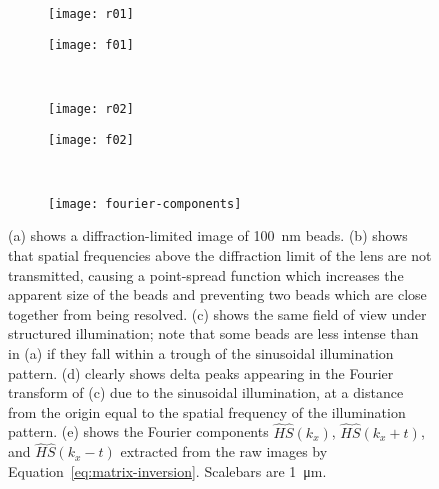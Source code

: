 \begin{figure}[p]
\centering
\begin{subfigure}[b]{0.45\textwidth}
	\texttt{[image: r01]}
	\caption{}\label{fig:beads-widefield}
\end{subfigure}
\raisebox{9.3em}{\noindent\Huge$\Leftrightarrow$}
\begin{subfigure}[b]{0.45\textwidth}
	\texttt{[image: f01]}
	\caption{}\label{fig:fourier-widefield}
\end{subfigure}
~\newline
\begin{subfigure}[b]{0.45\textwidth}
	\texttt{[image: r02]}
	\caption{}\label{fig:beads-raw-SIM}
\end{subfigure}
\raisebox{9.3em}{\noindent\Huge$\Leftrightarrow$}
\begin{subfigure}[b]{0.45\textwidth}
	\texttt{[image: f02]}
	\caption{}\label{fig:fourier-raw-SIM}
\end{subfigure}
~\newline
\begin{subfigure}[b]{0.45\textwidth}
	\texttt{[image: fourier-components]}
	\caption{}\label{fig:fourier-components}
\end{subfigure}
\caption[LAG SIM: A sinusoidal illumination pattern is visible as delta peaks in Fourier space]{(a) shows a diffraction-limited image of \SI{100}{\nano\metre} beads.
(b) shows that spatial frequencies above the diffraction limit of the lens are not transmitted, causing a point-spread function which increases the apparent size of the beads and preventing two beads which are close together from being resolved.
(c) shows the same field of view under structured illumination; note that some beads are less intense than in (a) if they fall within a trough of the sinusoidal illumination pattern.
(d) clearly shows delta peaks appearing in the Fourier transform of (c) due to the sinusoidal illumination, at a distance from the origin equal to the spatial frequency of the illumination pattern.
(e) shows the Fourier components $\hat{H}\hat{S}\left(k_x\right)$, $\hat{H}\hat{S}\left(k_x+t\right)$, and $\hat{H}\hat{S}\left(k_x-t\right)$ extracted from the raw images by Equation~\ref{eq:matrix-inversion}. Scalebars are \SI{1}{\micro\metre}.
}
\label{fig:fourier-reconstruction}
\end{figure}

